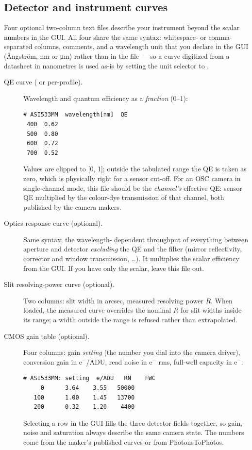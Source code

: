 \subsection{Detector and instrument curves}
\label{sec:file-curves}

Four optional two-column text files describe your instrument beyond the
scalar numbers in the GUI. All four share the same syntax: whitespace- or
comma-separated columns, \code{\#} comments, and a wavelength unit that
you declare in the GUI (\AA{}ngstr\"om, nm or \si{\micro\metre}) rather
than in the file --- so a curve digitized from a datasheet in nanometres
is used as-is by setting the unit selector to .

\begin{description}
\item[QE curve ( or per-profile).] Wavelength and
  quantum efficiency as a \emph{fraction} (0--1):
\begin{verbatim}
# ASI533MM  wavelength[nm]  QE
 400  0.62
 500  0.80
 600  0.72
 700  0.52
\end{verbatim}
  Values are clipped to [0, 1]; outside the tabulated range the QE is
  taken as zero, which is physically right for a sensor cut-off. For an
  OSC camera in single-channel mode, this file should be the
  \emph{channel's} effective QE: sensor QE multiplied by the colour-dye
  transmission of that channel, both published by the camera makers.
\item[Optics response curve (optional).] Same syntax; the wavelength-%
  dependent throughput of everything between aperture and detector
  \emph{excluding} the QE and the filter (mirror reflectivity, corrector
  and window transmission, \dots). It multiplies the scalar efficiency
  from the GUI. If you have only the scalar, leave this file out.
\item[Slit resolving-power curve (optional).] Two columns: slit width in
  arcsec, measured resolving power $R$. When loaded, the measured curve
  overrides the nominal $R$ for slit widths inside its range; a width
  outside the range is refused rather than extrapolated.
\item[CMOS gain table (optional).] Four columns: gain \emph{setting} (the
  number you dial into the camera driver), conversion gain in
  e$^-$/ADU, read noise in e$^-$ rms, full-well capacity in e$^-$:
\begin{verbatim}
# ASI533MM: setting  e/ADU   RN    FWC
     0      3.64    3.55   50000
   100      1.00    1.45   13700
   200      0.32    1.20    4400
\end{verbatim}
  Selecting a row in the GUI fills the three detector fields together, so
  gain, noise and saturation always describe the same camera state. The
  numbers come from the maker's published curves or from
  PhotonsToPhotos.
\end{description}

